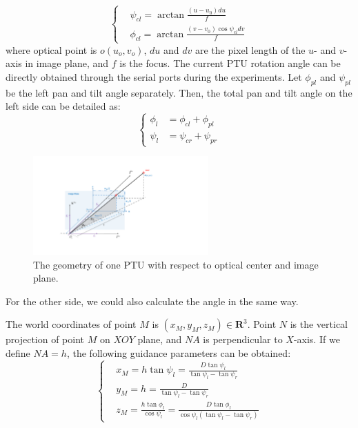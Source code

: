 \begin{equation} 
\left \{
	\begin{split}
		& \psi_{cl} = \arctan \frac{(u-u_0)du}{f} \\
		& \phi_{cl} = \arctan \frac{(v-v_0)\cos\psi_{cl}dv}{f} 
	\end{split}
\right.
\end{equation}
where optical point is $o(u_o,v_o)$, $du$ and $dv$ are the pixel length of the $u$- and $v$-axis in image plane, and $f$ is the focus. The current PTU rotation angle can be directly obtained through the serial ports during the experiments. Let $\phi_{pl}$ and $\psi_{pl}$ be the left pan and tilt angle separately. Then, the total pan and tilt angle on the left side can be detailed as:
\begin{equation} 
\left \{
	\begin{split}
	    \phi_l &= \phi_{cl} + \phi_{pl} \\ 
	    \psi_l &= \psi_{cr} + \psi_{pr}
	\end{split}
\right.
\end{equation}

\begin{figure}[!th]
	\centering
	\includegraphics[width=0.6\textwidth]{Figs/chp03_vision_02_image_plane.pdf}
	\caption{The geometry of one PTU with respect to optical center and image plane.}
	\label{fig:Fig02_ImagePlaneOnly}
\end{figure}


For the other side, we could also calculate the angle in the same way.

The world coordinates of point ${M}$ is $(x_M, y_M, z_M)\in \textbf{R}^3 $. Point $N$ is the vertical projection of point $M$ on $XOY$ plane, and $NA$ is perpendicular to $X$-axis. If we define $NA = h$, the following guidance parameters can be obtained:
\begin{equation}
\left \{
\begin{aligned}
&x_M = h \tan \psi_l = \frac{D\tan \psi_l}{\tan \psi_l - \tan \psi_r}            \\
&y_M = h = \frac{D}{\tan \psi_l - \tan \psi_r} \\
&z_M = \frac{h\tan \phi_l}{\cos \psi_l} = \frac{D\tan \phi_l}{\cos \psi_l(\tan \psi_l - \tan \psi_r)}
\end{aligned} \right.
\label{eq:M_Positon_Equation}
\end{equation} 


